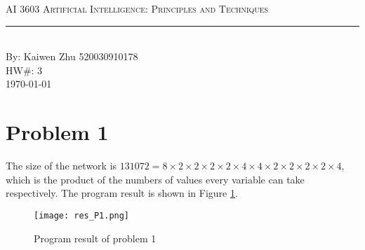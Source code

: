\documentclass[12pt]{article}
\newcommand{\labtitle}{
{\fontsize{15pt}{18pt}\selectfont AI 3603 Artificial Intelligence: Principles and Techniques}}
\newcommand{\authorname}{Kaiwen Zhu 520030910178}
\newcommand{\hw}{3}
\begin{document}


\begin{titlepage}
\begin{center}
{\Large \textsc{\labtitle} \\ \vspace{4pt}}
\rule[13pt]{\textwidth}{1pt} \\ \vspace{150pt}
{\large By: \authorname \\ \vspace{10pt}
HW\#: \hw \\ \vspace{10pt}
\today}
\end{center}
\end{titlepage}

\section{Problem 1}
The size of the network is $131072 = 8 \times 2 \times 2 \times 2 \times 2 \times 4 \times 4 \times 2 \times 2 \times 2 \times 2 \times 4$, which is the product of the numbers of values every variable can take respectively. The program result is shown in Figure \ref{res_P1}.
\begin{figure}[H]
    \centering
    \texttt{[image: res\_P1.png]}
    \caption{Program result of problem 1}
    \label{res_P1}
\end{figure}
\end{document}
